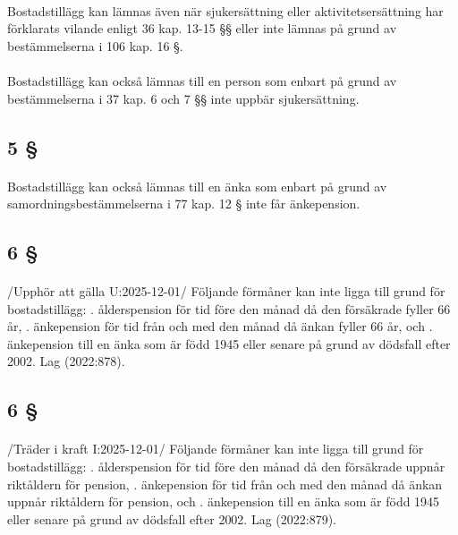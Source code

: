\documentclass[a4paper,notitlepage,openany,10pt]{book}
\begin{document}
\paragraph*{}
Bostadstillägg kan lämnas även när sjukersättning eller aktivitetsersättning har förklarats vilande enligt 36 kap. 13-15 §§ eller inte lämnas på grund av bestämmelserna i 106 kap. 16 §.
\paragraph*{}
Bostadstillägg kan också lämnas till en person som enbart på grund av bestämmelserna i 37 kap. 6 och 7 §§ inte uppbär sjukersättning.
\subsection*{5 §}
\paragraph*{}
Bostadstillägg kan också lämnas till en änka som enbart på grund av samordningsbestämmelserna i 77 kap. 12 § inte får änkepension.
\subsection*{6 §}
\paragraph*{}
/Upphör att gälla U:2025-12-01/
Följande förmåner kan inte ligga till grund för bostadstillägg:
. ålderspension för tid före den månad då den försäkrade fyller 66 år,
. änkepension för tid från och med den månad då änkan fyller 66 år, och
. änkepension till en änka som är född 1945 eller senare på grund av dödsfall efter 2002.
Lag (2022:878).
\subsection*{6 §}
\paragraph*{}
/Träder i kraft I:2025-12-01/
Följande förmåner kan inte ligga till grund för bostadstillägg:
. ålderspension för tid före den månad då den försäkrade uppnår riktåldern för pension,
. änkepension för tid från och med den månad då änkan uppnår riktåldern för pension, och
. änkepension till en änka som är född 1945 eller senare på grund av dödsfall efter 2002.
Lag (2022:879).
\end{document}
